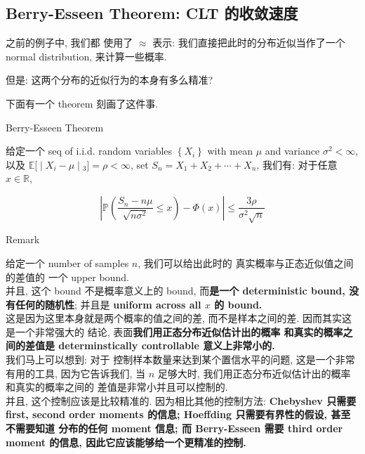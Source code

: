 \documentclass{qlnotes-export}
\begin{document}
\subsection{Berry-Esseen Theorem: CLT 的收敛速度}\label{berry-esseen-theorem-clt-ux7684ux6536ux655bux901fux5ea6}

之前的例子中, 我们都 使用了 \(\approx\) 表示: 我们直接把此时的分布近似当作了一个 normal distribution, 来计算一些概率.

但是: 这两个分布的近似行为的本身有多么精准?

下面有一个 theorem 刻画了这件事.

\begin{theorem}{Berry-Esseen Theorem}\label{thm-05-clt-berry-esseen-theorem}

给定一个 seq of i.i.d. random variables \(\left\{ X_{i} \right\}\) with mean \(\mu\) and variance \(\sigma^{2} < \infty\), 以及 \(\left. {\mathbb{E}}\lbrack \middle| X_{i} - \mu \middle| {}_{3}\rbrack = \rho < \infty \right.\), set \(S_{n} = X_{1} + X_{2} + \cdots + X_{n}\), 我们有: 对于任意 \(x \in {\mathbb{R}}\),

\[\left| {{\mathbb{P}}\left( {\frac{S_{n} - n\mu}{\sqrt{n\sigma^{2}}} \leq x} \right) - \Phi(x)} \right| \leq \frac{3\rho}{\sigma^{2}\sqrt{n}}\]

\end{theorem}

\begin{qlremark}{Remark}

给定一个 number of samples \(n\), 我们可以给出此时的 真实概率与正态近似值之间的差值的 一个 upper bound.\\
并且, 这个 bound 不是概率意义上的 bound, 而\textbf{是一个 deterministic bound, 没有任何的随机性}; 并且是 \textbf{uniform across all \(x\) 的 bound.}\\
这是因为这里本身就是两个概率的值之间的差, 而不是样本之间的差. 因而其实这是一个非常强大的 结论, 表面\textbf{我们用正态分布近似估计出的概率 和真实的概率之间的差值是 determinstically controllable 意义上非常小的.}\\
我们马上可以想到: 对于 控制样本数量来达到某个置信水平的问题, 这是一个非常有用的工具, 因为它告诉我们, 当 \(n\) 足够大时, 我们用正态分布近似估计出的概率和真实的概率之间的 差值是非常小并且可以控制的.\\
并且, 这个控制应该是比较精准的. 因为相比其他的控制方法: \textbf{Chebyshev 只需要 first, second order moments 的信息; Hoeffding 只需要有界性的假设, 甚至不需要知道 分布的任何 moment 信息; 而 Berry-Esseen 需要 third order moment 的信息, 因此它应该能够给一个更精准的控制.}

\end{qlremark}
\end{document}
